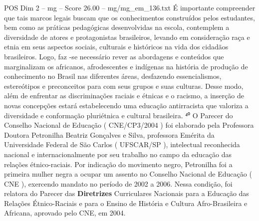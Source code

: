 \begin{textsample}{POS Dim 2 – mg – Score 26.00 – mg/mg\_em\_136.txt}
É importante compreender que tais marcos legais buscam que os conhecimentos construídos pelos estudantes, bem como as práticas pedagógicas desenvolvidas na escola, contemplem a diversidade de atores e protagonistas brasileiros, levando em consideração raça e etnia em seus aspectos sociais, culturais e históricos na vida dos cidadãos brasileiros.
Logo, faz -se necessário rever as abordagens e conteúdos que marginalizam os africanos, afrodescentes e indígenas na história de produção de conhecimento no Brasil nas diferentes áreas, desfazendo essencialismos, estereótipos e preconceitos para com seus grupos e suas culturas.
Desse modo, além de enfrentar as discriminações raciais e étnicas e o racismo, a inserção de novas concepções estará estabelecendo uma educação antirracista que valoriza a diversidade e conformação pluriétnica e cultural brasileira. ⁴⁰ O Parecer do Conselho Nacional de Educação ( CNE/CP3/2004 ) foi elaborado pela Professora Doutora Petronilha Beatriz Gonçalves e Silva, professora Emérita da Universidade Federal de São Carlos ( UFSCAR/SP ), intelectual reconhecida nacional e internacionalmente por seu trabalho no campo da educação das relações étnico-raciais.
Por indicação do movimento negro, Petronilha foi a primeira mulher negra a ocupar um assento no Conselho Nacional de Educação ( CNE ), exercendo mandato no período de 2002 a 2006.
Nessa condição, foi relatora do Parecer das \textbf{Diretrizes} Curriculares Nacionais para a Educação das Relações Étnico-Raciais e para o Ensino de História e Cultura Afro-Brasileira e Africana, aprovado pelo CNE, em 2004.

\end{textsample}
